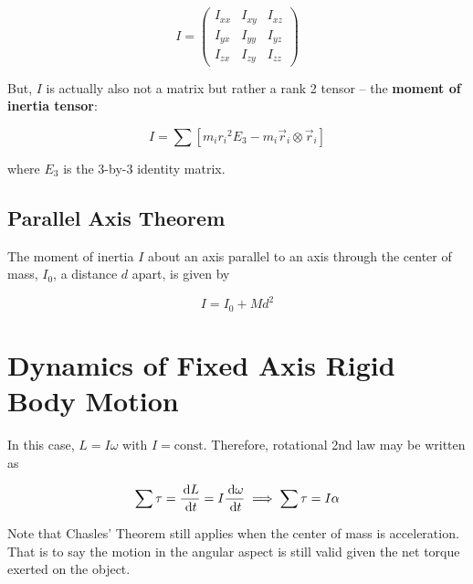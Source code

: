 \begin{equation}
	I = \begin{pmatrix}
		I_{xx} & I_{xy} & I_{xz}\\
		I_{yx} & I_{yy} & I_{yz}\\
		I_{zx} & I_{zy} & I_{zz}
	\end{pmatrix}
\end{equation}

But, $I$ is actually also not a matrix but rather a rank 2 tensor -- the \textbf{moment of inertia tensor}:

\begin{equation}
	I = \sum \left[m_i {r_i}^2 E_3 - m_i \vec r_i \otimes \vec r_i\right]
\end{equation}

where $E_3$ is the 3-by-3 identity matrix.

\subsection{Parallel Axis Theorem}

\begin{theorem}
	The moment of inertia $I$ about an axis parallel to an axis through the center of mass, $I_0$, a distance $d$ apart, is given by

	\begin{equation}
		I = I_0 + Md^2
	\end{equation}
\end{theorem}

\section{Dynamics of Fixed Axis Rigid Body Motion}

In this case, $L = I\omega$ with $I = \text{const}$. Therefore, rotational 2nd law may be written as

\begin{equation}
	\sum \tau = \frac{\D L}{\D t} = I \frac{\D \omega}{\D t} \implies \sum \tau = I \alpha
\end{equation}


\begin{remark}
	Note that Chasles' Theorem still applies when the center of mass is acceleration. That is to say the motion in the angular aspect is still valid given the net torque exerted on the object.
\end{remark}

